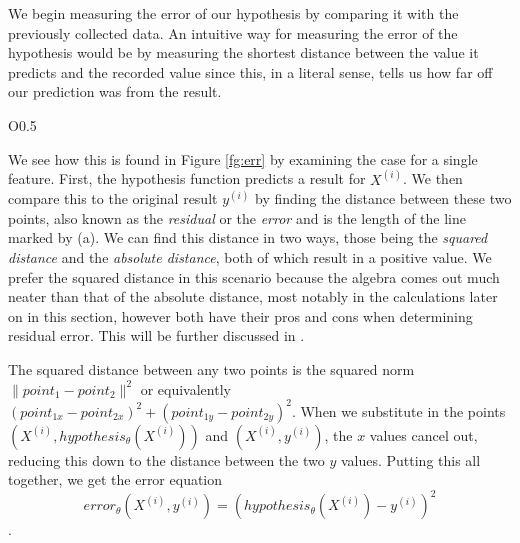We begin measuring the error of our hypothesis by comparing it with the
previously collected data.  An intuitive way for measuring the  error of the
hypothesis would be by measuring the shortest distance between the value it
predicts and the recorded value since this, in a literal sense, tells us how far
off our prediction was from the result.

\begin{wrapfigure}{O}{0.5\textwidth}
    \centering
    \caption{Visual representation of the distance between expected and actual
    results.}
    \label{fg:err}
\end{wrapfigure}

We see how this is found in Figure \ref{fg:err} by examining the case for
a single feature. First, the hypothesis function predicts a result for $X^{(i)}$. We
then compare this to the original result $y^{(i)}$ by finding the distance
between these two points, also known as the \emph{residual} or the \emph{error}
and is the length of the line marked by (a). We can find this distance in two ways, those being the \emph{squared distance} and the \emph{absolute distance}, both of which result in a positive value.
We prefer the squared distance in this scenario because the algebra comes out much neater than that of the absolute distance, most notably in the calculations later on in this section, however both have their pros and cons when determining residual error. This will be further discussed in \placeholder.

The squared distance between any two points
is the squared norm $\| point_1 - point_2 \|^2$ or
equivalently $(point_{1x}-point_{2x})^2 + (point_{1y}-point_{2y})^2$. When we
substitute in the points $(X^{(i)}, hypothesis_{\theta}(X^{(i)}))$ and $(X^{(i)}, y^{(i)})$, the $x$ values cancel out, reducing this down to the distance between the two $y$ values. Putting this all
together, we get the error equation
\begin{equation}
    error_{\theta}(X^{(i)}, y^{(i)}) = (hypothesis_{\theta}(X^{(i)}) - y^{(i)})^2
\end{equation}
.


